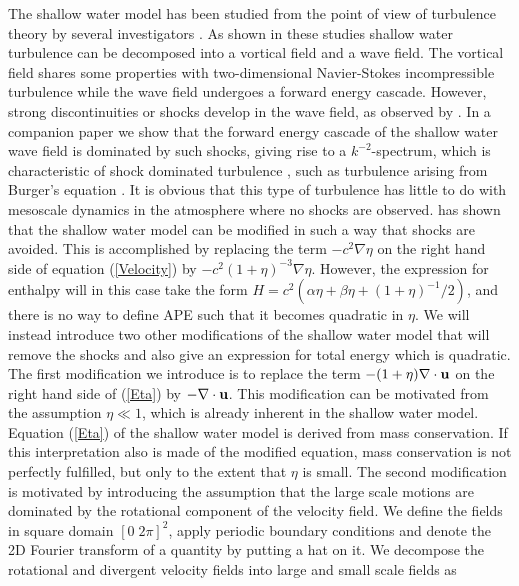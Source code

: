 The shallow water model has been studied from the point of view of turbulence theory by several investigators \citep{FargeSadourny1989, YuanHamilton1994, Dritschel2001}.
As shown in these studies shallow water turbulence can be decomposed into a vortical field and a wave field. The vortical field shares some properties with two-dimensional Navier-Stokes incompressible turbulence while the  wave field undergoes a forward energy cascade. However, strong discontinuities or shocks develop in the wave field, as observed by \citet{SpallMcWilliams1992}. 
In a companion paper \citep{AugierMohananLindborg2017} we show that the forward energy cascade of the shallow water wave field is dominated by such shocks, 
giving rise to a $ k^{-2} $-spectrum, which is  characteristic of shock dominated turbulence \citep{Kuznetsov2004}, such as turbulence arising from Burger's equation  \citep{BouchaudMezardParisi1995}.  It is obvious that this type of turbulence has little to do with mesoscale dynamics in the atmosphere where no shocks are observed. \citet{Buhler1998} has shown that the shallow water model can be modified in such a way that shocks are avoided. This is accomplished by replacing the term  $ -c^{2} \nabla \eta $ on the right hand side of equation (\ref{Velocity}) by  $ -c^{2}(1+\eta)^{-3} \nabla \eta $. However, the  expression for enthalpy will in this case take the form $ H = c^2( \alpha \eta + \beta \eta+ (1+\eta)^{-1}/2) $, and there is no way to define APE such that it becomes quadratic in $ \eta $. 
We will instead introduce two other modifications of the shallow water model that will remove the shocks and also give an expression for total energy which is quadratic. The first modification we introduce is to replace the term
$ -(1+\eta) \nabla \cdot  {\bf u} $ on the right hand side of (\ref{Eta}) by $ -\nabla \cdot {\bf u} $. This modification can be motivated from the assumption $ \eta \ll 1 $, which is already inherent in the shallow water model. 
{ Equation (\ref{Eta}) of the shallow water model is derived from mass conservation. If this interpretation also is made of the modified equation,  mass conservation is not perfectly fulfilled, but only to the extent that $ \eta $ is small.}  The second modification is motivated by introducing the assumption that the large scale motions are dominated by the rotational component of the velocity field.  We define the fields in square domain $ 
[0 \; 2\pi]^2 $, apply periodic boundary conditions and denote the 2D Fourier transform of a quantity by putting a hat on it. We decompose the rotational and divergent velocity fields into large and small scale fields as
